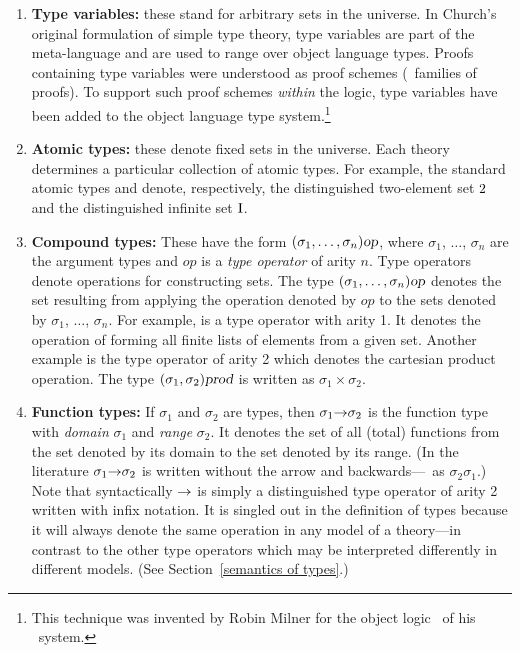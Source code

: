 \begin{enumerate}

\item {\bf Type variables:} these stand for arbitrary
sets in the universe.  In Church's original formulation of simple type
theory, type variables are part of the meta-language and are used to
range over object language types.  Proofs containing type variables
were understood as proof schemes (\ie\ families of proofs). To support
such proof schemes {\it within} the \HOL{} logic, type variables have
been added to the object language type system.\footnote{This technique
was invented by Robin Milner for the object logic \PPL\ of his \LCF\
system.}

\item {\bf Atomic types:} these denote fixed sets in the universe. Each
theory determines a particular collection of atomic types.  For
example, the standard atomic types  and  denote,
respectively, the distinguished two-element set $\mbox{\rm 2}$ and the
distinguished infinite set $\mbox{\rm I}$.

\item {\bf Compound types:} These have the
form $(\sigma_1,\ldots,\sigma_n)\textsl{op}$, where $\sigma_1$, $\dots$,
$\sigma_n$ are the argument types and $op$ is a {\it type operator\/}
of arity $n$.  Type operators denote operations for constructing sets.
The type $(\sigma_1,\ldots,\sigma_n)\textsl{op}$ denotes the set resulting
from applying the operation denoted by $op$ to the sets denoted by
$\sigma_1$, $\dots$, $\sigma_n$.  For example,
 is a type operator with arity 1.  It denotes the operation
of forming all finite lists of elements from a given set.  Another
example is the type operator \ty{prod} of arity 2 which denotes the
cartesian product operation.  The type $(\sigma_1,\sigma_2)\textsl{prod}$
is written as $\sigma_1\times\sigma_2$.

\item {\bf Function types:} If $\sigma_1$
and $\sigma_2$ are types, then $\sigma_1{\to}\sigma_2$ is the function
type with {\it domain\/} $\sigma_1$ and {\it range} $\sigma_2$. It
denotes the set of all (total) functions from the set denoted by its
domain to the set denoted by its range. (In the literature
$\sigma_1{\to}\sigma_2$ is written without the arrow and
backwards---\ie\ as $\sigma_2\sigma_1$.) Note that syntactically
${\to}$ is simply a distinguished type operator of arity 2 written with
infix notation. It is singled out in the definition of \HOL{} types
because it will always denote the same operation in any
model of a \HOL{} theory---in contrast to the other type operators which
may be interpreted differently in different models. (See
Section~\ref{semantics of types}.)


\end{enumerate}

